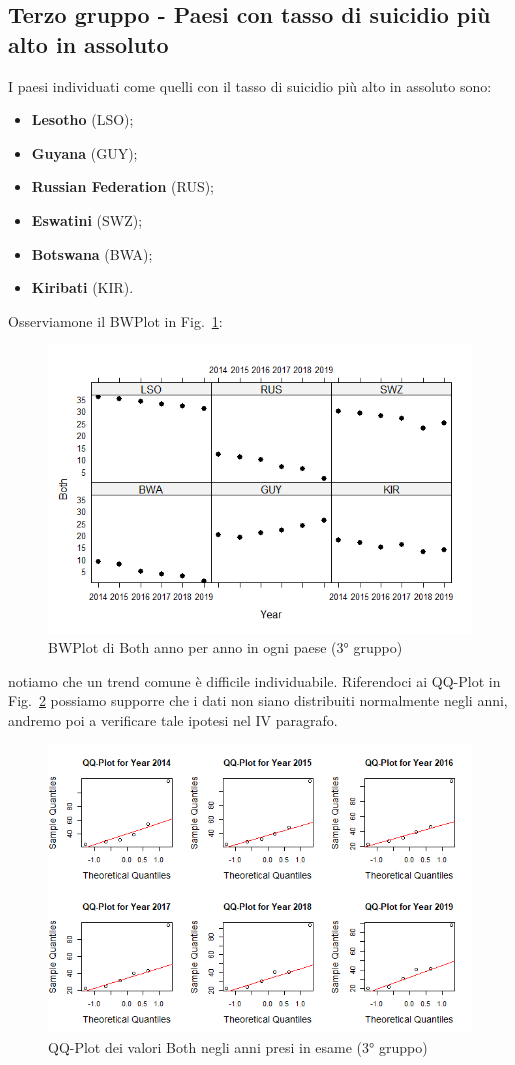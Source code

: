 \documentclass[conference]{IEEEtran}
\begin{document}
\subsection{Terzo gruppo - Paesi con tasso di suicidio più alto in assoluto}

I paesi individuati come quelli con il tasso di suicidio più alto
in assoluto sono:
\begin{itemize}
    \item \textbf{Lesotho} (LSO);
    \item \textbf{Guyana} (GUY);
    \item \textbf{Russian Federation} (RUS);
    \item \textbf{Eswatini} (SWZ);
    \item \textbf{Botswana} (BWA);
    \item \textbf{Kiribati} (KIR). 
\end{itemize}
Osserviamone il BWPlot in Fig.~\ref{9thridgroup}:
\begin{figure}[htbp]
    \centerline{\includegraphics[width=.5\textwidth]{img/9 - Thirdgroup.png}}
    \caption{BWPlot di Both anno per anno in ogni paese (3° gruppo)}
    \label{9thridgroup}
\end{figure}
notiamo che un trend comune è difficile individuabile.
Riferendoci ai QQ-Plot in Fig.~\ref{10thirdqq} possiamo supporre che i dati non siano
distribuiti normalmente negli anni, andremo poi a verificare tale ipotesi nel IV paragrafo.
\begin{figure}[htbp]
    \centerline{\includegraphics[width=.5\textwidth]{img/10 - Thirdqq.png}}
    \caption{QQ-Plot dei valori Both negli anni presi in esame (3° gruppo)}
    \label{10thirdqq}
\end{figure}
\end{document}

